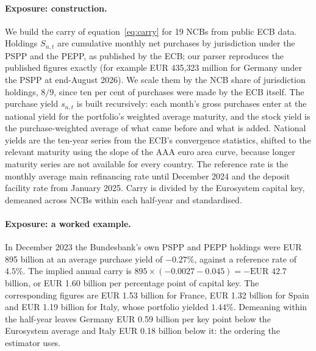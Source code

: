 \documentclass[11pt]{article}
\theoremstyle{plain}
\begin{document}
\paragraph{Exposure: construction.}
We build the carry of equation~\eqref{eq:carry} for 19 NCBs from public ECB data. Holdings $S_{n,t}$ are cumulative monthly net purchases by jurisdiction under the PSPP and the PEPP, as published by the ECB; our parser reproduces the published figures exactly (for example EUR 435{,}323 million for Germany under the PSPP at end-August 2026). We scale them by the NCB share of jurisdiction holdings, $8/9$, since ten per cent of purchases were made by the ECB itself. The purchase yield $s_{n,t}$ is built recursively: each month's gross purchases enter at the national yield for the portfolio's weighted average maturity, and the stock yield is the purchase-weighted average of what came before and what is added. National yields are the ten-year series from the ECB's convergence statistics, shifted to the relevant maturity using the slope of the AAA euro area curve, because longer maturity series are not available for every country. The reference rate is the monthly average main refinancing rate until December 2024 and the deposit facility rate from January 2025. Carry is divided by the Eurosystem capital key, demeaned across NCBs within each half-year and standardised.

\paragraph{Exposure: a worked example.}
In December 2023 the Bundesbank's own PSPP and PEPP holdings were EUR 895 billion at an average purchase yield of $-0.27\%$, against a reference rate of $4.5\%$. The implied annual carry is $895 \times (-0.0027 - 0.045) = -\text{EUR }42.7$ billion, or EUR 1.60 billion per percentage point of capital key. The corresponding figures are EUR 1.53 billion for France, EUR 1.32 billion for Spain and EUR 1.19 billion for Italy, whose portfolio yielded $1.44\%$. Demeaning within the half-year leaves Germany EUR 0.59 billion per key point below the Eurosystem average and Italy EUR 0.18 billion below it: the ordering the estimator uses.
\end{document}
